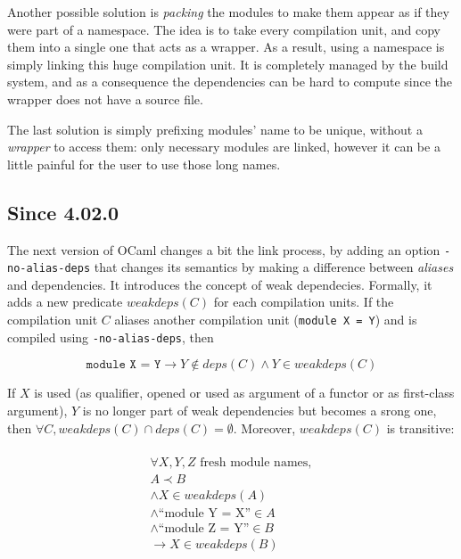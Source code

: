 \documentclass[11pt,a4paper]{article}
\begin{document}
Another possible solution is \emph{packing} the modules to make them appear as
if they were part of a namespace. The idea is to take every compilation unit,
and copy them into a single one that acts as a wrapper. As a result, using a
namespace is simply linking this huge compilation unit. It is completely managed
by the build system, and as a consequence the dependencies can be hard to
compute since the wrapper does not have a source file.

The last solution is simply prefixing modules' name to be unique, without a
\emph{wrapper} to access them: only necessary modules are linked, however it can
be a little painful for the user to use those long names.

\subsection{Since 4.02.0}

The next version of OCaml changes a bit the link process, by adding an option
\texttt{-no-alias-deps} that changes its semantics by making a difference
between \emph{aliases} and dependencies. It introduces the concept of weak
dependecies. Formally, it adds a new predicate $weakdeps(C)$ for each
compilation units. If the compilation unit $C$ aliases another compilation unit
(\texttt{module X = Y}) and is compiled using \texttt{-no-alias-deps}, then

$$\texttt{module~X = Y} \rightarrow Y \notin deps(C) \land Y \in weakdeps(C)$$ 

If $X$ is used (as qualifier, opened or used as argument of a functor or as
first-class argument), $Y$ is no longer part of weak dependencies but becomes a
srong one, then $\forall C, weakdeps(C) \cap deps(C) = \emptyset$. Moreover,
$weakdeps(C)$ is transitive:

\begin{multline} \\
\forall X, Y, Z \text{ fresh module names}, \\ A \prec B \\
\land X \in weakdeps(A) \\ 
\land \text{``module Y = X''} \in A \\
\land \text{``module Z = Y''} \in B \\
\rightarrow X \in weakdeps(B)
\end{multline}
\end{document}
